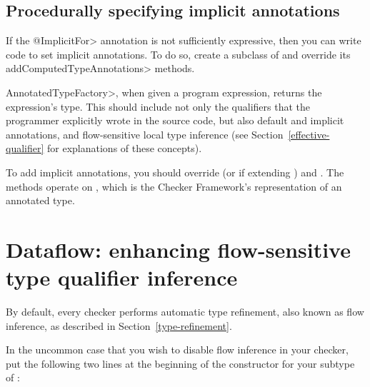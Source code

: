 \subsection{Procedurally specifying implicit annotations\label{procedurally-specifying-implicit-annotations}}

If the \<@ImplicitFor> annotation is not sufficiently expressive, then you
can write code to set implicit annotations.  To do so, create a subclass of
 and override its
\<addComputedTypeAnnotations> methods.

\<AnnotatedTypeFactory>, when given a program
expression, returns the expression's type.  This should include not only
the qualifiers that the programmer explicitly wrote in the source code, but
also default and implicit annotations, and flow-sensitive local type
inference (see Section~\ref{effective-qualifier} for explanations of these
concepts).

To add implicit annotations, you should override
(or
if extending )
and
.
The methods operate on ,
which is the Checker Framework's representation of an annotated type.



\section{Dataflow: enhancing flow-sensitive type qualifier inference\label{dataflow}}

By default, every checker performs automatic type refinement, also known as
flow inference, as described
in Section~\ref{type-refinement}.

In the uncommon case that you wish to disable flow inference in your
checker, put the following two lines at the beginning of the constructor
for your subtype of
:


